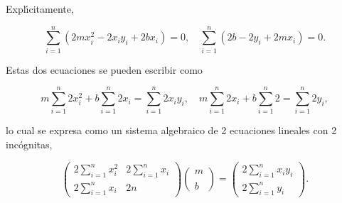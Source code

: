 \documentclass[10pd,hyperref={colorlinks=true}]{beamer}
\begin{document}

\begin{frame}{}

Expl\'{\i}citamente,

$$
\sum\limits_{i=1}^n(2mx_i^2 - 2 x_iy_i + 2 bx_i) = 0,\quad
\sum\limits_{i=1}^n(2 b -2 y_i + 2 mx_i) = 0.
$$

Estas dos ecuaciones se pueden escribir como

$$
m\sum\limits_{i=1}^n2x_i^2 + b \sum\limits_{i=1}^n 2 x_i = 
\sum\limits_{i=1}^n 2 x_iy_i,\quad
m\sum\limits_{i=1}^n 2 x_i + b \sum\limits_{i=1}^n2 =
\sum\limits_{i=1}^n2 y_i,
$$

lo cual se expresa como un sistema algebraico de 2 ecuaciones lineales 
con 2 inc\'ognitas,

$$
\left(\begin{array}{cc}
2\sum\limits_{i=1}^nx_i^2 & 2\sum\limits_{i=1}^n x_i \\
2\sum\limits_{i=1}^n x_i & 2n
\end{array}\right)
\left(\begin{array}{c}
m \\ \\
b
\end{array}\right) =
\left(\begin{array}{c}
2\sum\limits_{i=1}^n x_iy_i \\
2\sum\limits_{i=1}^n y_i
\end{array}\right).
$$

 \end{frame}

\end{document}
